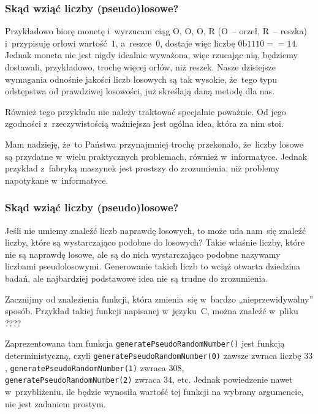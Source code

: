 \documentclass[10pt,t]{beamer}
\begin{document}
\begin{frame}
  \frametitle{Skąd wziąć liczby (pseudo)losowe?}


  Przykładowo biorę monetę i~wyrzucam ciąg $\text{O}$, $\text{O}$,
  $\text{O}$, $\text{R}$ ($\text{O}$~-- orzeł, $\text{R}$~-- reszka)
  i~przypisuję orłowi wartość~$1$, a~reszce~$0$, dostaje więc liczbę
  $0\text{b}1110 == 14$. Jednak moneta nie jest nigdy idealnie wyważona,
  więc rzucając nią, będziemy dostawali, przykładowo, trochę więcej orłów,
  niż reszek. Nasze dzisiejsze wymagania odnośnie jakości liczb losowych
  są tak wysokie, że~tego typu odstępstwa od prawdziwej losowości, już
  skreślają daną metodę dla nas.

  Również tego przykładu nie należy traktować specjalnie poważnie. Od jego
  zgodności z~rzeczywistością ważniejsza jest ogólna idea, która za nim
  stoi.

  Mam nadzieję, że~to Państwa przynajmniej trochę przekonało, że~liczby
  losowe są przydatne w~wielu praktycznych problemach, również
  w~informatyce. Jednak przykład z~fabryką maszynek jest prostszy do
  zrozumienia, niż problemy napotykane w~informatyce.

\end{frame}





\begin{frame}
  \frametitle{Skąd wziąć liczby (pseudo)losowe?}


  Jeśli nie umiemy znaleźć liczb naprawdę losowych, to może uda nam~się
  znaleźć liczby, które są wystarczająco podobne do losowych? Takie
  właśnie liczby, które nie są naprawdę losowe, ale są do nich
  wystarczająco podobne nazywamy liczbami
  {pseudolosowymi}. Generowanie takich liczb to wciąż otwarta dziedzina
  badań, ale najbardziej podstawowe idea nie są trudne do zrozumienia.

  Zacznijmy od znalezienia funkcji, która zmienia~się w~bardzo
  „nieprzewidywalny” sposób. Przykład takiej funkcji napisanej w~języku~C,
  można znaleźć w~pliku ????

  Zaprezentowana tam funkcja \texttt{generatePseudoRandomNumber()} jest
  funkcją deterministyczną, czyli \texttt{generatePseudoRandomNumber(0)}
  zawsze zwraca liczbę $33$, \texttt{generatePseudoRandomNumber(1)}
  zwraca $308$, \texttt{generatePseudoRandomNumber(2)} zwraca $34$, etc.
  Jednak powiedzenie nawet w~przybliżeniu, ile będzie wynosiła wartość
  tej funkcji na wybrany argumencie, nie jest zadaniem prostym.

\end{frame}
\end{document}
